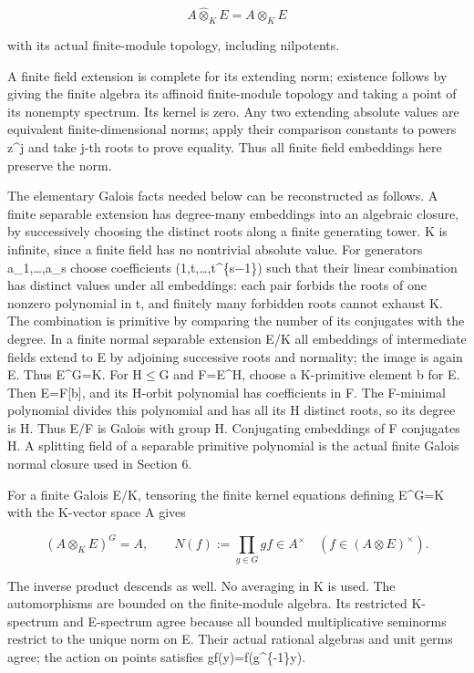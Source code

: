 \documentclass[
  10pt,
]{article}
\begin{document}
\[
            A\widehat\otimes_K E=A\otimes_K E               \tag{4}
\]

with its actual finite-module topology, including nilpotents.

A finite field extension is complete for its extending norm; existence
follows by giving the finite algebra its affinoid finite-module topology
and taking a point of its nonempty spectrum. Its kernel is zero. Any two
extending absolute values are equivalent finite-dimensional norms; apply
their comparison constants to powers z\^{}j and take j-th roots to prove
equality. Thus all finite field embeddings here preserve the norm.

The elementary Galois facts needed below can be reconstructed as
follows. A finite separable extension has degree-many embeddings into an
algebraic closure, by successively choosing the distinct roots along a
finite generating tower. K is infinite, since a finite field has no
nontrivial absolute value. For generators a\_1,\ldots,a\_s choose
coefficients (1,t,\ldots,t\^{}\{s\ensuremath{-}1\}) such that their linear
combination has distinct values under all embeddings: each pair forbids
the roots of one nonzero polynomial in t, and finitely many forbidden
roots cannot exhaust K. The combination is primitive by comparing the
number of its conjugates with the degree. In a finite normal separable
extension E/K all embeddings of intermediate fields extend to E by
adjoining successive roots and normality; the image is again E. Thus
E\^{}G=K. For H\ensuremath{\le}G and F=E\^{}H, choose a K-primitive element b for E.
Then E=F{[}b{]}, and its H-orbit polynomial has coefficients in F. The
F-minimal polynomial divides this polynomial and has all its
\textbar H\textbar{} distinct roots, so its degree is
\textbar H\textbar. Thus E/F is Galois with group H. Conjugating
embeddings of F conjugates H. A splitting field of a separable primitive
polynomial is the actual finite Galois normal closure used in Section 6.

For a finite Galois E/K, tensoring the finite kernel equations defining
E\^{}G=K with the K-vector space A gives

\[
 (A\otimes_K E)^G=A,\qquad
 N(f):=\prod_{g\in G}gf\in A^\times\quad(f\in(A\otimes E)^\times). \tag{5}
\]

The inverse product descends as well. No averaging in K is used. The
automorphisms are bounded on the finite-module algebra. Its restricted
K-spectrum and E-spectrum agree because all bounded multiplicative
seminorms restrict to the unique norm on E. Their actual rational
algebras and unit germs agree; the action on points satisfies
\textbar gf(y)\textbar=\textbar f(g\^{}\{-1\}y)\textbar.
\end{document}
